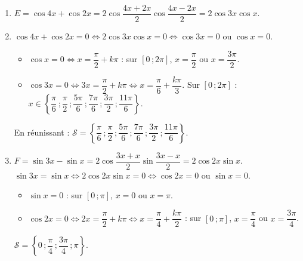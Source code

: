 \documentclass[11pt]{article}
\begin{document}
\begin{corrige}
\begin{enumerate}
\item $E = \cos 4x + \cos 2x = 2\cos\dfrac{4x+2x}{2}\cos\dfrac{4x-2x}{2} = 2\cos 3x \cos x$.
\item $\cos 4x + \cos 2x = 0 \iff 2\cos 3x \cos x = 0 \iff \cos 3x = 0$ ou $\cos x = 0$.
\begin{itemize}
\item $\cos x = 0 \iff x = \dfrac{\pi}{2} + k\pi$ : sur $[0\,;2\pi]$, $x = \dfrac{\pi}{2}$ ou $x = \dfrac{3\pi}{2}$.
\item $\cos 3x = 0 \iff 3x = \dfrac{\pi}{2} + k\pi \iff x = \dfrac{\pi}{6} + \dfrac{k\pi}{3}$. Sur $[0\,;2\pi]$ : $x \in \left\{\dfrac{\pi}{6}\,;\dfrac{\pi}{2}\,;\dfrac{5\pi}{6}\,;\dfrac{7\pi}{6}\,;\dfrac{3\pi}{2}\,;\dfrac{11\pi}{6}\right\}$.
\end{itemize}
En réunissant : $\mathcal{S} = \left\{\dfrac{\pi}{6}\,;\dfrac{\pi}{2}\,;\dfrac{5\pi}{6}\,;\dfrac{7\pi}{6}\,;\dfrac{3\pi}{2}\,;\dfrac{11\pi}{6}\right\}$.
\item $F = \sin 3x - \sin x = 2\cos\dfrac{3x+x}{2}\sin\dfrac{3x-x}{2} = 2\cos 2x \sin x$.\\
$\sin 3x = \sin x \iff 2\cos 2x \sin x = 0 \iff \cos 2x = 0$ ou $\sin x = 0$.
\begin{itemize}
\item $\sin x = 0$ : sur $[0\,;\pi]$, $x = 0$ ou $x = \pi$.
\item $\cos 2x = 0 \iff 2x = \dfrac{\pi}{2} + k\pi \iff x = \dfrac{\pi}{4} + \dfrac{k\pi}{2}$ : sur $[0\,;\pi]$, $x = \dfrac{\pi}{4}$ ou $x = \dfrac{3\pi}{4}$.
\end{itemize}
$\mathcal{S} = \left\{0\,;\dfrac{\pi}{4}\,;\dfrac{3\pi}{4}\,;\pi\right\}$.
\end{enumerate}
\end{corrige}
\end{document}
